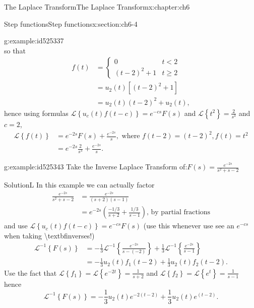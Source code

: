 \documentclass[oneside,10pt,]{book}
\numberwithin{equation}{section}
\numberwithin{equation}{section}
\newcommand{\lt}{<}
\newcommand{\amp}{&}
\begin{document}
\begin{chapterptx}{The Laplace Transform}{}{The Laplace Transform}{}{}{x:chapter:ch6}
\begin{sectionptx}{Step functions}{}{Step functions}{}{}{x:section:ch6-4}
\begin{example}{}{g:example:id525337}
\begin{equation*}
\end{equation*}
so that%
\begin{align*}
f(t) \amp =\begin{cases}
0 \amp t\lt 2\\
\left(t-2\right)^{2}+1 \amp t\geq2
\end{cases}\\
\amp =u_{2}(t)\left[\left(t-2\right)^{2}+1\right]\\
\amp =u_{2}(t)\left(t-2\right)^{2}+u_{2}(t),
\end{align*}
hence using formulas \(\mathcal{L}\left\{ u_{c}(t)f\left(t-c\right)\right\} =e^{-cs}F(s)\) and \(\mathcal{L}\left\{ t^{2}\right\} =\frac{2}{s^{3}}\) and \(c=2\),%
\begin{align*}
\mathcal{L}\left\{ f(t)\right\}  \amp =e^{-2s}F(s)+\frac{e^{-2s}}{s},\,\,\text{where }f(t-2)=\left(t-2\right)^{2},f(t)=t^{2}\\
\amp =e^{-2s}\frac{2}{s^{3}}+\frac{e^{-2s}}{s}.
\end{align*}
%
\end{example}
\begin{example}{}{g:example:id525343}%
Take the Inverse Laplace Transform of:\({\displaystyle F(s)=\frac{e^{-2s}}{s^{2}+s-2}}\)%
\par
SolutionL In this example we can actually factor%
\begin{align*}
\frac{e^{-2s}}{s^{2}+s-2} \amp =\frac{e^{-2s}}{\left(s+2\right)\left(s-1\right)}\\
\amp =e^{-2s}\left(\frac{-1/3}{s+2}+\frac{1/3}{s-1}\right),\,\text{by partial fractions}
\end{align*}
and use \(\mathcal{L}\left\{ u_{c}(t)f\left(t-c\right)\right\} =e^{-cs}F(s)\) (use this whenever use see an \(e^{-cs}\) when taking \textbackslash{}textbf\textbraceleft{}inverses\textbraceright{}!)%
\begin{align*}
\mathcal{L}^{-1}\left\{ F(s)\right\}  \amp =-\frac{1}{3}\mathcal{L}^{-1}\left\{ \frac{e^{-2s}}{s-(-2)}\right\} +\frac{1}{3}\mathcal{L}^{-1}\left\{ \frac{e^{-2s}}{s-1}\right\} \\
\amp =-\frac{1}{3}u_{2}(t)f_{1}\left(t-2\right)+\frac{1}{3}u_{2}(t)f_{2}\left(t-2\right).
\end{align*}
Use the fact that \(\mathcal{L}\left\{ f_{1}\right\} =\mathcal{L}\left\{ e^{-2t}\right\} =\frac{1}{s+2}\) and \(\mathcal{L}\left\{ f_{2}\right\} =\mathcal{L}\left\{ e^{t}\right\} =\frac{1}{s-1}\) hence%
\begin{equation*}
\mathcal{L}^{-1}\left\{ F(s)\right\} =-\frac{1}{3}u_{2}(t)e^{-2\left(t-2\right)}+\frac{1}{3}u_{2}(t)e^{(t-2)}.

\end{equation*}
\end{example}
\end{sectionptx}
\end{chapterptx}
\end{document}
